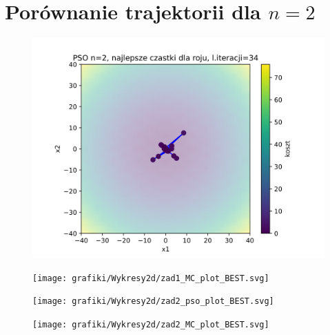 \documentclass[11pt, a4paper, oneside]{article}
\begin{document}
\section{Porównanie trajektorii dla $n = 2$}

\begin{figure}[h]
\centering
\begin{minipage}[b]{\dimexpr.5\textwidth-1em}
  \centering
  \includegraphics[width=1\linewidth]{grafiki/Wykresy2d/zad1_pso_plot_BEST.svg}
  \label{fig:skalowalnosc:PSO1}
\end{minipage} \hfill
\begin{minipage}[b]{\dimexpr.5\textwidth-1em}
  \centering
  \texttt{[image: grafiki/Wykresy2d/zad1\_MC\_plot\_BEST.svg]}
  \label{fig:skalowalnosc:PSO2}
\end{minipage}
\end{figure}

\begin{figure}[h]
\centering
\begin{minipage}[b]{\dimexpr.5\textwidth-1em}
  \centering
  \texttt{[image: grafiki/Wykresy2d/zad2\_pso\_plot\_BEST.svg]}
  \label{fig:skalowalnosc:MC1}
\end{minipage} \hfill
\begin{minipage}[b]{\dimexpr.5\textwidth-1em}
  \centering
  \texttt{[image: grafiki/Wykresy2d/zad2\_MC\_plot\_BEST.svg]}
  \label{fig:skalowalnosc:MC2}
\end{minipage}
\end{figure}
\end{document}
